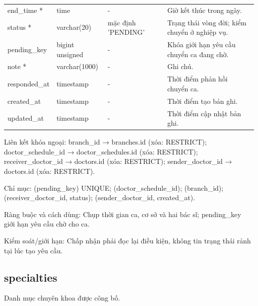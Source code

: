 {\begin{longtable}{@{}L{\textwidth-4.86pt\relax} L{\textwidth-3.96pt\relax} L{\textwidth-2.88pt\relax} L{\textwidth-6.3pt\relax}@{}}
end\_\allowbreak{}time * & time & - & Giờ kết thúc trong ngày.\allowbreak{}\\[1pt]
status * & varchar(20) & mặc định 'PENDING' & Trạng thái vòng đời; kiểm chuyển ở nghiệp vụ.\allowbreak{}\\[1pt]
pending\_\allowbreak{}key & bigint unsigned & - & Khóa giới hạn yêu cầu chuyển ca đang chờ.\allowbreak{}\\[1pt]
note * & varchar(1000) & - & Ghi chú.\allowbreak{}\\[1pt]
responded\_\allowbreak{}at & timestamp & - & Thời điểm phản hồi chuyển ca.\allowbreak{}\\[1pt]
created\_\allowbreak{}at & timestamp & - & Thời điểm tạo bản ghi.\allowbreak{}\\[1pt]
updated\_\allowbreak{}at & timestamp & - & Thời điểm cập nhật bản ghi.\allowbreak{}\\[1pt]
\end{longtable}}
Liên kết khóa ngoại:\allowbreak{} branch\_\allowbreak{}id → branches.\allowbreak{}id (xóa:\allowbreak{} RESTRICT); doctor\_\allowbreak{}schedule\_\allowbreak{}id → doctor\_\allowbreak{}schedules.\allowbreak{}id (xóa:\allowbreak{} RESTRICT); receiver\_\allowbreak{}doctor\_\allowbreak{}id → doctors.\allowbreak{}id (xóa:\allowbreak{} RESTRICT); sender\_\allowbreak{}doctor\_\allowbreak{}id → doctors.\allowbreak{}id (xóa:\allowbreak{} RESTRICT).\allowbreak{}

Chỉ mục:\allowbreak{} (pending\_\allowbreak{}key) UNIQUE; (doctor\_\allowbreak{}schedule\_\allowbreak{}id); (branch\_\allowbreak{}id); (receiver\_\allowbreak{}doctor\_\allowbreak{}id, status); (sender\_\allowbreak{}doctor\_\allowbreak{}id, created\_\allowbreak{}at).\allowbreak{}

Ràng buộc và cách dùng:\allowbreak{} Chụp thời gian ca, cơ sở và hai bác sĩ; pending\_\allowbreak{}key giới hạn yêu cầu chờ cho ca.\allowbreak{}

Kiểm soát/\allowbreak{}giới hạn:\allowbreak{} Chấp nhận phải đọc lại điều kiện, không tin trạng thái rảnh tại lúc tạo yêu cầu.\allowbreak{}

\clearpage

\subsection{specialties}
Danh mục chuyên khoa được công bố.\allowbreak{}


